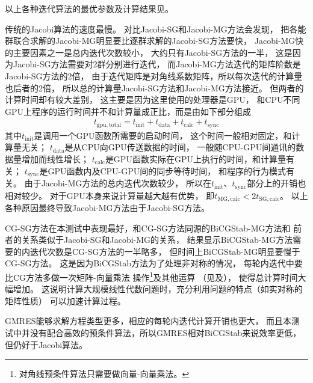 
以上各种迭代算法的最优参数及计算结果见。

传统的Jacobi算法的速度最慢。
对比Jacobi-SG和Jacobi-MG方法会发现，
把各能群联合求解的Jacobi-MG明显要比逐群求解的Jacobi-SG方法要快，
Jacobi-MG快的主要因素之一是总内迭代次数较小，
大约只有Jacobi-SG方法的一半，
这是因为Jacobi-SG方法需要对2群分别进行迭代，
而Jacobi-MG方法迭代的矩阵阶数是Jacobi-SG方法的2倍，
由于迭代矩阵是对角线系数矩阵，所以每次迭代的计算量也后者的2倍，
所以总的计算量Jacobi-SG方法和Jacobi-MG方法接近。
但两者的计算时间却有较大差别，
这主要是因为这里使用的处理器是GPU，
和CPU不同GPU上程序的运行时间并不和计算量成正比，而是由如下部分组成
\begin{align}
  t_\mathrm{gpu,total} = t_\mathrm{init} + t_\mathrm{data} + t_\mathrm{calc} + t_\mathrm{sync}
\end{align}
其中$t_\mathrm{init}$是调用一个GPU函数所需要的启动时间，
这个时间一般相对固定，和计算量无关；
$t_\mathrm{data}$是从CPU向GPU传送数据的时间，
一般随CPU-GPU间通讯的数据量增加而线性增长；
$t_\mathrm{calc}$是GPU函数实际在GPU上执行的时间，和计算量有关；
$t_\mathrm{sync}$是GPU函数内及CPU-GPU间的同步等待时间，
和程序的行为模式有关。
由于Jacobi-MG方法的总内迭代次数较少，
所以在$t_\mathrm{init}$、$t_\mathrm{sync}$部分上的开销也相对较少。
对于GPU本身来说计算量越大越有优势，
即$t_\mathrm{MG,calc}<2t_\mathrm{SG,calc}$。
以上各种原因最终导致Jacobi-MG方法由于Jacobi-SG方法。

CG-SG方法在本测试中表现最好，和CG-SG方法同源的BiCGStab-MG方法和
前者的关系类似于Jacobi-SG和Jacobi-MG的关系，
结果显示BiCGStab-MG方法需要的内迭代次数是CG-SG方法的一半略多，
但时间上BiCGStab-MG明显要慢于CG-SG方法。
这是因为BiCGStab方法为了处理非对称的情况，
每轮内迭代中要比CG方法多做一次矩阵-向量乘法
操作\footnote{对角线预条件算法只需要做向量-向量乘法。}及其他运算
（见及），
使得总计算时间大幅增加。
这说明计算大规模线性代数问题时，充分利用问题的特点（如实对称的矩阵性质）
可以加速计算过程。

GMRES能够求解方程类型更多，相应的每轮内迭代计算开销也更大，
而且本测试中并没有配合高效的预条件算法，所以GMRES相对BiCGStab来说效率更低，
但仍好于Jacobi算法。

